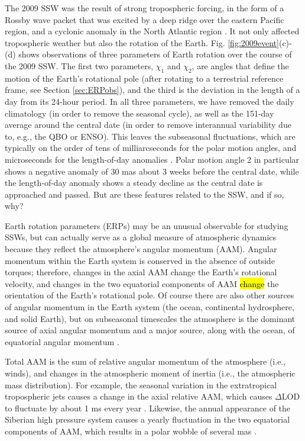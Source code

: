 \documentclass[draft,jgrga]{agutex}
\begin{document}
\begin{article}
The 2009 SSW was the result of strong tropospheric forcing, in the form of a Rossby wave packet that was excited by a deep ridge over the eastern Pacific region, and a cyclonic anomaly in the North Atlantic region \citep{ayarzaguenaetal2011}.
It not only affected  tropospheric weather but also the rotation of the Earth.
Fig. \ref{fig:2009event}(c)-(d) shows observations of three parameters of Earth rotation over the course of the 2009 SSW.  
The first two parameters, $\chi_1$ and $\chi_2$, are angles that define the motion of the Earth's rotational pole  {(after rotating to a terrestrial reference frame, see Section} \ref{sec:ERPobs}), and the third is the deviation in the length of a day from its 24-hour period.
 {In all three parameters, we have removed the daily climatology (in order to remove the seasonal cycle), as well as the 151-day average around the central date (in order to remove interannual variability due to, e.g., the QBO or ENSO).
This leaves the subseasonal fluctuations, which are typically on the order of tens of milliarcseconds for the polar motion angles, and microseconds for the length-of-day anomalies} \citep{salsteinrosen1989, eubanksetal1985,rosenetal1991}.  
 {Polar motion angle 2 in particular shows a negative anomaly of 30 mas about 3 weeks before the central date, while the length-of-day anomaly shows a steady decline as the central date is approached and passed.  
But are these features related to the SSW, and if so, why?}

Earth rotation parameters (ERPs) may be an unusual observable for studying SSWs, but can actually serve as a global measure of  atmospheric dynamics because they reflect the atmosphere's angular momentum (AAM).  
Angular momentum within the Earth system is conserved in the absence of outside torques; therefore, changes in the axial AAM   change the Earth's rotational velocity, and changes in the two equatorial components of AAM \hl{change} the orientation of the Earth's rotational pole.
Of course there are also other sources of angular momentum in the Earth system (the ocean, continental hydrosphere, and solid Earth), but on subseasonal timescales the atmosphere is the dominant source of axial angular momentum \citep{Rosen1983,eubanksetal1985} and a major source, along with the ocean, of equatorial angular momentum  \citep{dobslawetal2010}. 

Total AAM is the sum of relative angular momentum of the atmosphere (i.e., winds), and changes in the atmospheric moment of inertia (i.e., the atmospheric mass distribution).
For example, the seasonal variation in the extratropical tropospheric jets causes a change in the axial relative AAM, which causes $\Delta$LOD to fluctuate by about 1 ms every year \citep{hideetal1997}.
Likewise, the annual appearance of the Siberian high pressure system  {causes} a yearly fluctuation in the two equatorial components of AAM, which results in a polar wobble of several mas \citep{chao_au1991,nastulaetal2009,dobslawetal2010}.


\end{article}
\end{document}
